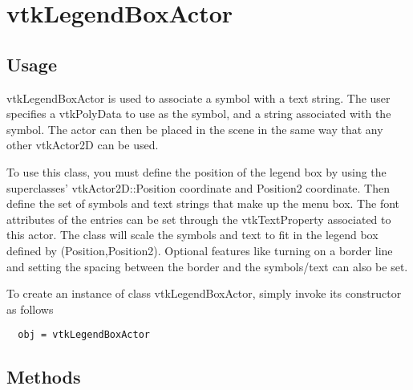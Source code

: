 \section{vtkLegendBoxActor}

\subsection{Usage}

 vtkLegendBoxActor is used to associate a symbol with a text string.
 The user specifies a vtkPolyData to use as the symbol, and a string
 associated with the symbol. The actor can then be placed in the scene
 in the same way that any other vtkActor2D can be used.

 To use this class, you must define the position of the legend box by using
 the superclasses' vtkActor2D::Position coordinate and
 Position2 coordinate. Then define the set of symbols and text strings that
 make up the menu box. The font attributes of the entries can be set through
 the vtkTextProperty associated to this actor. The class will
 scale the symbols and text to fit in the legend box defined by
 (Position,Position2). Optional features like turning on a border line and
 setting the spacing between the border and the symbols/text can also be
 set.

To create an instance of class vtkLegendBoxActor, simply
invoke its constructor as follows
\begin{verbatim}
  obj = vtkLegendBoxActor
\end{verbatim}
\subsection{Methods}


